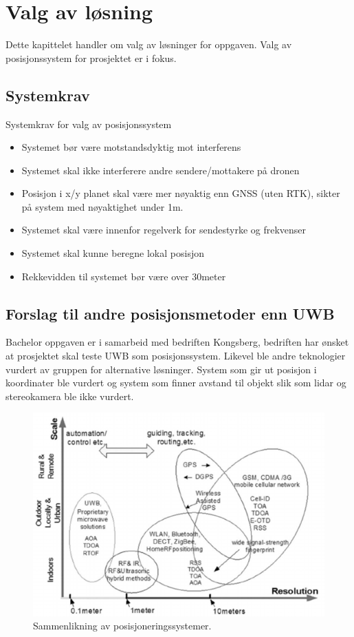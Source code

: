 \section{Valg av løsning}
Dette kapittelet handler om valg av løsninger for oppgaven. Valg av posisjonssystem for prosjektet er i fokus.

\subsection{Systemkrav}
Systemkrav for valg av posisjonssystem
\begin{itemize}
\item Systemet bør være motstandsdyktig mot interferens
\item Systemet skal ikke interferere andre sendere/mottakere på dronen
\item Posisjon i x/y planet skal være mer nøyaktig enn GNSS (uten RTK), sikter på system med nøyaktighet under 1m.
\item Systemet skal være innenfor regelverk for sendestyrke og frekvenser
\item Systemet skal kunne beregne lokal posisjon 
\item Rekkevidden til systemet bør være over 30meter
\end{itemize}

\subsection{Forslag til andre posisjonsmetoder enn UWB}
Bachelor oppgaven er i samarbeid med bedriften Kongsberg, bedriften har ønsket at prosjektet skal teste UWB som posisjonssystem. Likevel ble andre teknologier vurdert av gruppen for alternative løsninger. System som gir ut posisjon i koordinater ble vurdert og system som finner avstand til objekt slik som lidar og stereokamera ble ikke vurdert. 

\begin{figure}[htp]
    \centering
    \includegraphics[width=0.7\columnwidth]{figures/posisjoneringssystemer}
    \caption{Sammenlikning av posisjoneringssystemer.}
    \label{fig:posisjoneringssystemer}
\end{figure}

